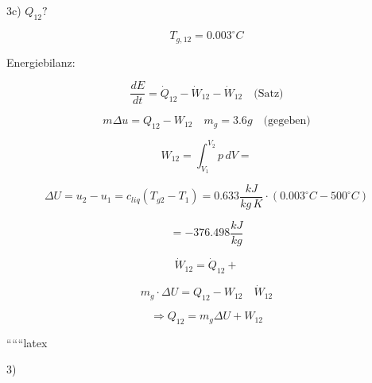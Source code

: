 3c) \(Q_{12}?\)

\[T_{g,12} = 0.003^\circ C\]

Energiebilanz:

\[
\frac{dE}{dt} = \dot{Q}_{12} - \dot{W}_{12} - \dot{W}_{12} \quad \text{(Satz)}
\]

\[
m \Delta u = Q_{12} - W_{12} \quad m_g = 3.6g \quad \text{(gegeben)}
\]

\[
W_{12} = \int_{V_1}^{V_2} p \, dV = 
\]

\[
\Delta U = u_2 - u_1 = c_{liq} (T_{g2} - T_1) = 0.633 \frac{kJ}{kg \, K} \cdot (0.003^\circ C - 500^\circ C)
\]

\[
= -376.498 \frac{kJ}{kg}
\]

\[
\dot{W}_{12} = \dot{Q}_{12} + 
\]

\[
m_g \cdot \Delta U = Q_{12} - W_{12} \quad \dot{W}_{12}
\]

\[
\Rightarrow Q_{12} = m_g \Delta U + W_{12}
\]

``````latex


3)